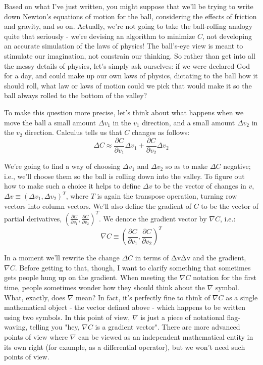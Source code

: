 \documentclass[a4paper,12pt]{report}%
\begin{document}
Based on what I've just written, you might suppose that we'll be trying to write down Newton's equations of motion for the ball, considering the effects of friction and gravity, and so on. Actually, we're not going to take the ball-rolling analogy quite that seriously - we're devising an algorithm to minimize $C$, not developing an accurate simulation of the laws of physics! The ball's-eye view is meant to stimulate our imagination, not constrain our thinking. So rather than get into all the messy details of physics, let's simply ask ourselves: if we were declared God for a day, and could make up our own laws of physics, dictating to the ball how it should roll, what law or laws of motion could we pick that would make it so the ball always rolled to the bottom of the valley?

To make this question more precise, let's think about what happens when we move the ball a small amount $\Delta v_{1}$ in the $v_{1}$ direction, and a small amount $\Delta v_{2}$ in the $v_{2}$ direction. Calculus tells us that $C$ changes as follows:
\begin{equation}
\Delta C  \approx  \frac{\partial C}{\partial v_{1}} \Delta v_{1} + \frac{\partial C}{\partial v_{2}} \Delta v_{2}
\end{equation}

We're going to find a way of choosing  $\Delta v_{1}$ and  $\Delta v_{2}$ so as to make $\Delta C$ negative; i.e., we'll choose them so the ball is rolling down into the valley. To figure out how to make such a choice it helps to define  $\Delta v$ to be the vector of changes in $v$, $\Delta v \equiv (\Delta v_{1}, \Delta v_{2})^{T}$, where $T$ is again the transpose operation, turning row vectors into column vectors. We'll also define the gradient of $C$ to be the vector of partial derivatives, $(\frac{\partial C}{\partial v_{1}}, \frac{\partial C}{\partial v_{2}})^{T}$. We denote the gradient vector by $\nabla C$, i.e.:
\begin{equation}
\nabla C \equiv \left( \frac{\partial C}{\partial v_{1}}, \frac{\partial C}{\partial v_{2}} \right)^{T}
\end{equation}

In a moment we'll rewrite the change $\Delta C$ in terms of ΔvΔv and the gradient, $\nabla C$. Before getting to that, though, I want to clarify something that sometimes gets people hung up on the gradient. When meeting the $\nabla C$ notation for the first time, people sometimes wonder how they should think about the $\nabla $ symbol. What, exactly, does $\nabla$ mean? In fact, it's perfectly fine to think of $\nabla C$ as a single mathematical object - the vector defined above - which happens to be written using two symbols. In this point of view, $\nabla$ is just a piece of notational flag-waving, telling you "hey, $\nabla C$ is a gradient vector". There are more advanced points of view where $\nabla$ can be viewed as an independent mathematical entity in its own right (for example, as a differential operator), but we won't need such points of view.
\end{document}
